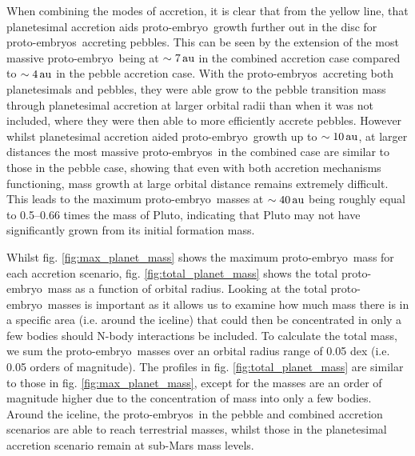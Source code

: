 \documentclass[a4paper,fleqn,usenatbib]{mnras}
\newcommand{\au}{{\, {\rm au}}}
\newcommand{\emb}{{{proto-embryo~}}}
\newcommand{\embs}{{{proto-embryos~}}}
\begin{document}
When combining the modes of accretion, it is clear that from the yellow line, that planetesimal accretion aids \emb growth further out in the disc for \embs accreting pebbles.
This can be seen by the extension of the most massive \emb being at $\sim 7\au$ in the combined accretion case compared to $\sim 4\au$ in the pebble accretion case.
With the \embs accreting both planetesimals and pebbles, they were able grow to the pebble transition mass through planetesimal accretion at larger orbital radii than when it was not included, where they were then able to more efficiently accrete pebbles.
However whilst planetesimal accretion aided \emb growth up to $\sim 10\au$, at larger distances the most massive \embs in the combined case are similar to those in the pebble case, showing that even with both accretion mechanisms functioning, mass growth at large orbital distance remains extremely difficult.
This leads to the maximum \emb masses at $\sim 40\au$ being roughly equal to 0.5--0.66 times the mass of Pluto, indicating that Pluto may not have significantly grown from its initial formation mass.

Whilst fig. \ref{fig:max_planet_mass} shows the maximum \emb mass for each accretion scenario, fig. \ref{fig:total_planet_mass} shows the total \emb mass as a function of orbital radius.
Looking at the total \emb masses is important as it allows us to examine how much mass there is in a specific area (i.e. around the iceline) that could then be concentrated in only a few bodies should N-body interactions be included.
To calculate the total mass, we sum the \emb masses over an orbital radius range of 0.05 dex (i.e. 0.05 orders of magnitude).
The profiles in fig. \ref{fig:total_planet_mass} are similar to those in fig. \ref{fig:max_planet_mass}, except for the masses are an order of magnitude higher due to the concentration of mass into only a few bodies.
Around the iceline, the \embs in the pebble and combined accretion scenarios are able to reach terrestrial masses, whilst those in the planetesimal accretion scenario remain at sub-Mars mass levels.
\end{document}
